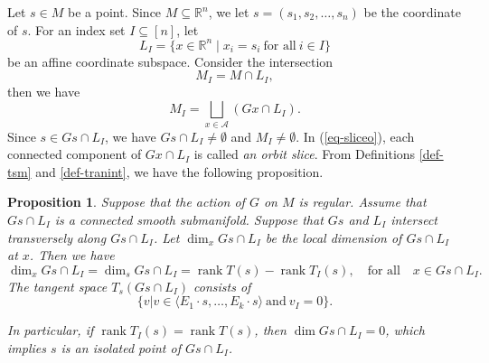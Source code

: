 \documentclass[reqno]{amsart}
\newtheorem{proposition}[theorem]{Proposition}
\theoremstyle{definition}
\numberwithin{equation}{section}
\theoremstyle{remark}
\begin{document}
Let $s\in M$ be a point. Since $M\subseteq \mathbb{R}^n$, we let $s=(s_1,s_2,\ldots,s_n)$ be the coordinate of $s$. For an index set $I\subseteq [n]$, let 
\begin{equation}\label{eq-LI}
L_I=\{x \in \mathbb{R}^n\mid x_i=s_i~\text{for all}~i\in I\}  
\end{equation}
be an affine coordinate subspace. Consider the intersection 
\begin{equation}\label{eq-MI}
M_I=M\cap L_I,
\end{equation}
then we have
\begin{equation}\label{eq-sliceo}
M_I=\bigsqcup_{x\in \mathcal{A}} (Gx\cap L_I).
\end{equation}
Since $s\in Gs\cap L_I$, we have $Gs\cap L_I\neq \emptyset$ and $M_I\neq \emptyset$. In (\ref{eq-sliceo}), each connected component of $Gx\cap L_I$ is called \emph{an orbit slice}. From Definitions \ref{def-tsm} and \ref{def-tranint}, we have the following proposition.
\begin{proposition}\label{prop-dim}
Suppose that the action of $G$ on $M$ is regular.
Assume that $Gs\cap L_I$ is a connected smooth submanifold. Suppose that
$Gs$ and $L_I$ intersect transversely along $Gs\cap L_I$.
Let  $\dim_x Gs\cap L_I$ be the local dimension of $Gs\cap L_I$ at $x$. Then we have 
$$\dim_x Gs\cap L_I=\dim_s Gs\cap L_I=\operatorname{rank}T(s)-\operatorname{rank}T_I(s),\quad\text{for all}\quad x\in Gs\cap L_I.$$
The tangent space $T_s (Gs\cap L_I)$ consists of 
$$\{v|v\in \langle E_1\cdot s,\ldots, E_k \cdot s \rangle~\text{and}~ v_I=0\}.$$

In particular, if $\operatorname{rank}T_I(s)=\operatorname{rank}T(s)$, then $\dim Gs\cap L_I=0$, which implies $s$ is an isolated point of $Gs\cap L_I$.
\end{proposition}
\end{document}
